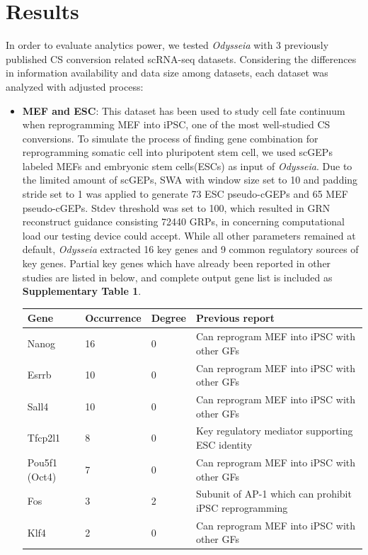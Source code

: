 \documentclass[fleqn,10pt]{wlscirep}
\begin{document}
\section*{Results}
\label{res}
In order to evaluate analytics power, we tested \emph{Odysseia} with 3 previously published CS conversion related scRNA-seq datasets.
Considering the differences in information availability and data size among datasets, each dataset was analyzed with adjusted process:
\begin{itemize}
\setlength\itemsep{0em}
\item \textbf{MEF and ESC}:
This dataset has been used to study cell fate continuum when reprogramming MEF into iPSC, one of the most well-studied CS conversions.\cite{mef_ipsc_cas}
To simulate the process of finding gene combination for reprogramming somatic cell into pluripotent stem cell, we used scGEPs labeled MEFs and embryonic stem cells(ESCs) as input of \emph{Odysseia}.
Due to the limited amount of scGEPs, SWA with window size set to 10 and padding stride set to 1 was applied to generate 73 ESC pseudo-cGEPs and 65 MEF pseudo-cGEPs.
Stdev threshold was set to 100, which resulted in GRN reconstruct guidance consisting 72440 GRPs, in concerning computational load our testing device could accept.
While all other parameters remained at default, \emph{Odysseia} extracted 16 key genes and 9 common regulatory sources of key genes.
Partial key genes which have already been reported in other studies are listed in below, and complete output gene list is included as \textbf{Supplementary Table 1}.

\begin{table}[ht]
\centering
\begin{tabular}{|l|l|l|l|}
\hline
\textbf{Gene} & \textbf{Occurrence} & \textbf{Degree} & \textbf{Previous report}  \\
\hline
Nanog & 16 & 0 & Can reprogram MEF into iPSC with other GFs\cite{ips7f, oct4_nanog_sox2_lin28, oct4_nanog_sox2} \\
\hline
Esrrb & 10 & 0 & Can reprogram MEF into iPSC with other GFs\cite{ips7f, LIF_esrrb, gtmEsrrb_iPSC, JARID2_PRDM14_ESRRB_SALL4A} \\
\hline
Sall4 & 10 & 0 & Can reprogram MEF into iPSC with other GFs\cite{ips7f, JARID2_PRDM14_ESRRB_SALL4A} \\
\hline
Tfcp2l1 & 8 & 0 & Key regulatory mediator supporting ESC identity\cite{tfcp2l1_1, tfcp2l1_2} \\
\hline
Pou5f1 (Oct4) & 7 & 0 & Can reprogram MEF into iPSC with other GFs\cite{yamanaka_2006, oct4_nanog_sox2_lin28, oct4_nanog_sox2, ips2f, ipsOK, osk} \\
\hline
Fos & 3 & 2 & Subunit of AP-1 which can prohibit iPSC reprogramming\cite{ips7f, ipsAP1} \\
\hline
Klf4 & 2 & 0 & Can reprogram MEF into iPSC with other GFs\cite{yamanaka_2006, ips2f, ipsOK, osk} \\
\hline
\end{tabular}
\end{table}


\end{itemize}
\end{document}
